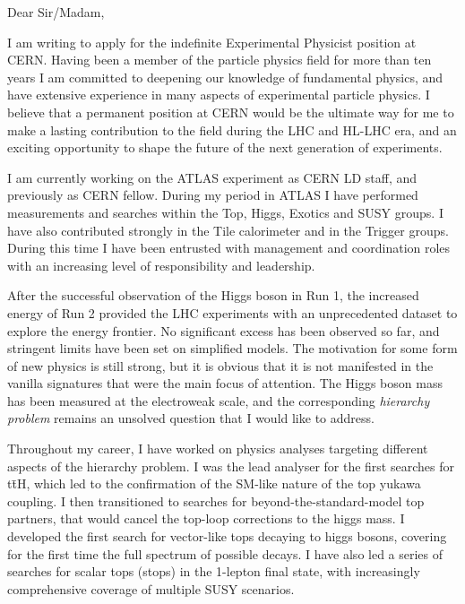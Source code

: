 \documentclass[11pt,a4paper,sans]{moderncv}        %
\begin{document}
\makecvtitle
\cvitem{}{
}
\vfill
Dear Sir/Madam,
\newline

I am writing to apply for the indefinite Experimental Physicist position at CERN.
Having been a member of the particle physics field for more than ten years I am committed to deepening our knowledge of fundamental physics, and have extensive experience in many aspects of experimental particle physics. I believe that a permanent position at CERN would be the ultimate way for me to make a lasting contribution to the field during the LHC and HL-LHC era, and an exciting opportunity to shape the future of the next generation of experiments.
\newline

I am currently working on the ATLAS experiment as CERN LD staff, and previously as CERN fellow. 
During my period in ATLAS I have performed measurements and searches within the Top, Higgs, Exotics and SUSY groups. I have also contributed strongly in the Tile calorimeter and in the Trigger groups. During this time I have been entrusted with management and coordination roles with an increasing level of responsibility and leadership. 
\newline

After the successful observation of the Higgs boson in Run 1, the increased energy of Run 2 provided the LHC experiments with an unprecedented dataset to explore the energy frontier. No significant excess has been observed so far, and stringent limits have been set on simplified models.
The motivation for some form of new physics is still strong, but it is obvious that it is not manifested in the vanilla signatures that were the main focus of attention.
The Higgs boson mass has been measured at the electroweak scale, and the corresponding \emph{hierarchy problem} remains an unsolved question that I would like to address.
\newline

Throughout my career, I have worked on physics analyses targeting different aspects of the hierarchy problem. I was the lead analyser for the first searches for t\=tH, which led to the confirmation of the SM-like nature of the top yukawa coupling. I then transitioned to searches for beyond-the-standard-model top partners, that would cancel the top-loop corrections to the higgs mass. I developed the first search for vector-like tops decaying to higgs bosons, covering for the first time the full spectrum of possible decays. I have also led a series of searches for scalar tops (stops) in the 1-lepton final state, with increasingly comprehensive coverage of multiple SUSY scenarios.
\newline
\end{document}

